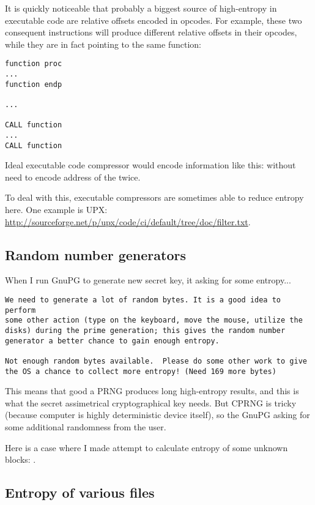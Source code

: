 It is quickly noticeable that probably a biggest source of high-entropy in executable code are relative offsets encoded in opcodes.
For example, these two consequent instructions will produce different relative offsets in their opcodes, 
while they are in fact pointing to the same function:

\begin{lstlisting}
function proc
...
function endp

...

CALL function
...
CALL function
\end{lstlisting}

Ideal executable code compressor would encode information like this:
 without need to encode
address of the  twice.

To deal with this, executable compressors are sometimes able to reduce entropy here.
One example is UPX: \url{http://sourceforge.net/p/upx/code/ci/default/tree/doc/filter.txt}.

\subsection{Random number generators}

When I run GnuPG to generate new secret key, it asking for some entropy...

\begin{lstlisting}
We need to generate a lot of random bytes. It is a good idea to perform
some other action (type on the keyboard, move the mouse, utilize the
disks) during the prime generation; this gives the random number
generator a better chance to gain enough entropy.

Not enough random bytes available.  Please do some other work to give
the OS a chance to collect more entropy! (Need 169 more bytes)
\end{lstlisting}

This means that good a PRNG produces long high-entropy results, and this is what the secret assimetrical cryptographical key needs.
But \ac{CPRNG} is tricky (because computer is highly deterministic device itself),
so the GnuPG asking for some additional randomness from the user.

Here is a case where I made attempt to calculate entropy of some unknown blocks: .

\subsection{Entropy of various files}

